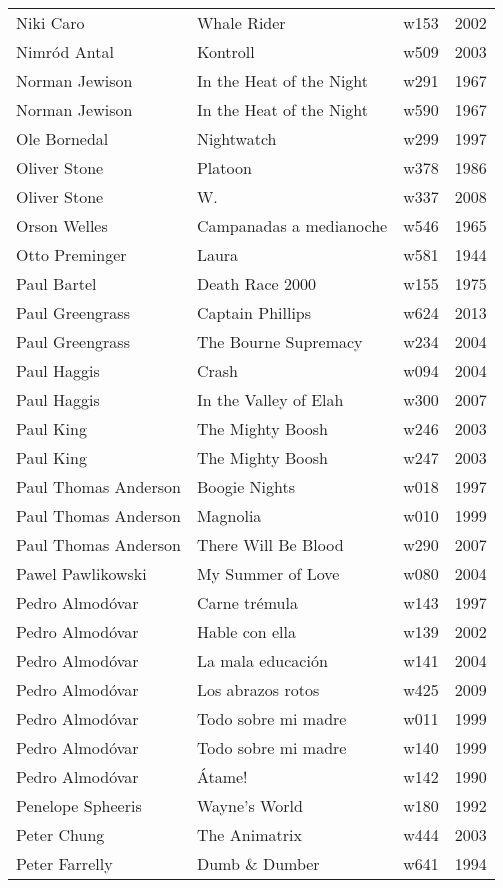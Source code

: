 \documentclass{article}
\begin{document}
\begin {center}
\begin{longtable}{l p{10cm} l l}
Niki Caro & Whale Rider & w153 & 2002 \\
Nimród Antal & Kontroll & w509 & 2003 \\
Norman Jewison & In the Heat of the Night & w291 & 1967 \\
Norman Jewison & In the Heat of the Night & w590 & 1967 \\
Ole Bornedal & Nightwatch & w299 & 1997 \\
Oliver Stone & Platoon & w378 & 1986 \\
Oliver Stone & W. & w337 & 2008 \\
Orson Welles & Campanadas a medianoche & w546 & 1965 \\
Otto Preminger & Laura & w581 & 1944 \\
Paul Bartel & Death Race 2000 & w155 & 1975 \\
Paul Greengrass & Captain Phillips & w624 & 2013 \\
Paul Greengrass & The Bourne Supremacy & w234 & 2004 \\
Paul Haggis & Crash & w094 & 2004 \\
Paul Haggis & In the Valley of Elah & w300 & 2007 \\
Paul King & The Mighty Boosh & w246 & 2003 \\
Paul King & The Mighty Boosh & w247 & 2003 \\
Paul Thomas Anderson & Boogie Nights & w018 & 1997 \\
Paul Thomas Anderson & Magnolia & w010 & 1999 \\
Paul Thomas Anderson & There Will Be Blood & w290 & 2007 \\
Pawel Pawlikowski & My Summer of Love & w080 & 2004 \\
Pedro Almodóvar & Carne trémula & w143 & 1997 \\
Pedro Almodóvar & Hable con ella & w139 & 2002 \\
Pedro Almodóvar & La mala educación & w141 & 2004 \\
Pedro Almodóvar & Los abrazos rotos & w425 & 2009 \\
Pedro Almodóvar & Todo sobre mi madre & w011 & 1999 \\
Pedro Almodóvar & Todo sobre mi madre & w140 & 1999 \\
Pedro Almodóvar & Átame! & w142 & 1990 \\
Penelope Spheeris & Wayne's World & w180 & 1992 \\
Peter Chung & The Animatrix & w444 & 2003 \\
Peter Farrelly & Dumb \& Dumber & w641 & 1994 \\

\end{longtable}
\end{center}
\end{document}
